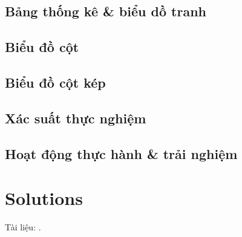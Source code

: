 \documentclass{article}
\numberwithin{equation}{section}
\begin{document}
\subsection{Bảng thống kê \& biểu dồ tranh}

\subsection{Biểu đồ cột}

\subsection{Biểu đồ cột kép}

\subsection{Xác suất thực nghiệm}

\subsection{Hoạt động thực hành \& trải nghiệm}




\section{Solutions}

\newpage
Tài liệu: \cite{SGK_Toan_6_Canh_Dieu_tap_1, SGK_Toan_6_Canh_Dieu_tap_2, SBT_Toan_6_Canh_Dieu_tap_1, Binh_Toan_6_tap_1, Binh_Toan_6_tap_2, Trong_Toan_6_2021}.

\printbibliography[heading=bibintoc]
	
\end{document}

